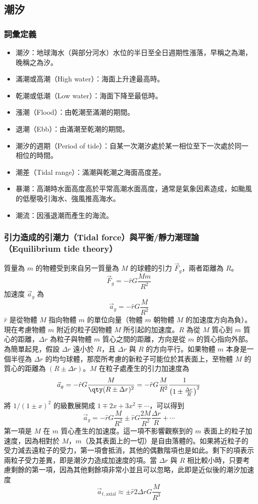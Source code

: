 \documentclass[a4paper,12pt]{report}
\begin{document}
\subsection{潮汐}
\subsubsection{詞彙定義}
\begin{itemize}
\item 潮汐：地球海水（與部分河水）水位的半日至全日週期性漲落，早稱之為潮，晚稱之為汐。
\item 滿潮或高潮（High water）：海面上升達最高時。
\item 乾潮或低潮（Low water）：海面下降至最低時。
\item 漲潮（Flood）：由乾潮至滿潮的期間。
\item 退潮（Ebb）：由滿潮至乾潮的期間。
\item 潮汐的週期（Period of tide）：自某一次潮汐處於某一相位至下一次處於同一相位的時間。
\item 潮差（Tidal range）：滿潮與乾潮之海面高度差。
\item 暴潮：高潮時水面高度高於平常高潮水面高度，通常是氣象因素造成，如颱風的低壓吸引海水、強風推高海水。
\item 潮流：因漲退潮而產生的海流。
\end{itemize}
\subsubsection{引力造成的引潮力（Tidal force）與平衡/靜力潮理論（Equilibrium tide theory）}
質量為 $m$ 的物體受到來自另一質量為 $M$ 的球體的引力 $\vec{F}_g$，兩者距離為 $R$。
\[
\vec{F}_g = - \hat{r}G\frac{M m}{R^2}
\]
加速度 $\vec{a}_g$ 為
\[
\vec{a}_g = - \hat{r}G\frac{M}{R^2}
\]
$\hat{r}$ 是從物體 $M$ 指向物體 $m$ 的單位向量（物體 $m$ 朝物體 $M$ 的加速度方向為負）。\\
現在考慮物體 $m$ 附近的粒子因物體 $M$ 所引起的加速度。$R$ 為從 $M$ 質心到 $m$ 質心的距離，$\Delta r$ 為粒子與物體 $m$ 質心之間的距離，方向是從 $m$ 的質心指向外部。為簡單起見，假設 $\Delta r$ 遠小於 $R$，且 $\Delta r$ 與 $R$ 的方向平行。如果物體 $m$ 本身是一個半徑為 $\Delta r$ 的均勻球體，那麼所考慮的新粒子可能位於其表面上，至物體 $M$ 的質心的距離為 $(R \pm \Delta r)$。$M$ 在粒子處產生的引力加速度為
\[
\vec{a}_g = - \hat{r}G\frac{M}{\qty(R \pm \Delta r)^2} = -\hat{r} G \frac{M}{R^2} \frac{1}{\left(1 \pm \frac{\Delta r}{R}\right)^2}
\]
將 $1/(1 \pm x)^2$ 的級數展開成 $1 \mp 2x + 3x^2 \mp \cdots$，可以得到
\[
\vec{a}_g = - \hat{r} G \frac{M}{R^2} \pm \hat{r} G \frac{2 M }{R^2} \frac{\Delta r}{R} + \cdots
\]
第一項是 $M$ 在 $m$ 質心產生的加速度。這一項不影響觀察到的 $m$ 表面上的粒子加速度，因為相對於 $M$，$m$（及其表面上的一切）是自由落體的。如果將近粒子的受力減去遠粒子的受力，第一項會抵消，其他的偶數階項也是如此。剩下的項表示兩粒子受力差異，即是潮汐力造成加速度的項。當 $\Delta r$ 與 $R$ 相比較小時，只要考慮剩餘的第一項，因為其他剩餘項非常小並且可以忽略，此即是近似後的潮汐加速度
\[
\vec{a}_{t,\text{axial}} \approx \pm \hat{r} 2 \Delta r  G  \frac{M}{R^3}
\]
\end{document}
